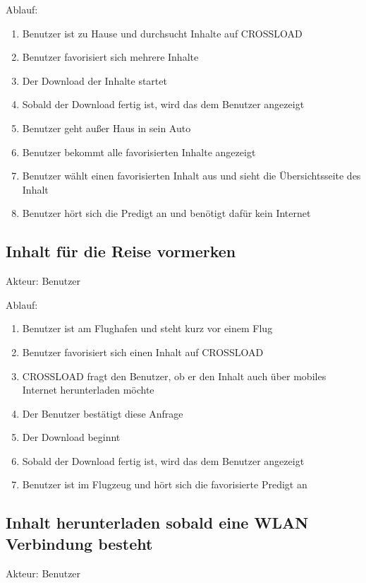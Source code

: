 Ablauf:
\begin{enumerate}
	\item Benutzer ist zu Hause und durchsucht Inhalte auf CROSSLOAD
	\item Benutzer favorisiert sich mehrere Inhalte
	\item Der Download der Inhalte startet
	\item Sobald der Download fertig ist, wird das dem Benutzer angezeigt
	\item Benutzer geht außer Haus in sein Auto
	\item Benutzer bekommt alle favorisierten Inhalte angezeigt
	\item Benutzer wählt einen favorisierten Inhalt aus und sieht die Übersichtsseite des Inhalt
	\item Benutzer hört sich die Predigt an und benötigt dafür kein Internet
\end{enumerate}

\subsection{Inhalt für die Reise vormerken}
Akteur: Benutzer

Ablauf:
\begin{enumerate}
	\item Benutzer ist am Flughafen und steht kurz vor einem Flug
	\item Benutzer favorisiert sich einen Inhalt auf CROSSLOAD
	\item CROSSLOAD fragt den Benutzer, ob er den Inhalt auch über mobiles Internet herunterladen möchte
	\item Der Benutzer bestätigt diese Anfrage
	\item Der Download beginnt
	\item Sobald der Download fertig ist, wird das dem Benutzer angezeigt
	\item Benutzer ist im Flugzeug und hört sich die favorisierte Predigt an
\end{enumerate}

\subsection{Inhalt herunterladen sobald eine WLAN Verbindung besteht}
Akteur: Benutzer

